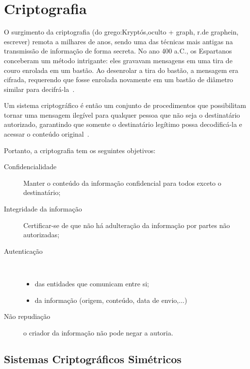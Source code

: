 

\chapter{Criptografia}

O surgimento da criptografia (do grego:Kryptós,oculto + graph, r.de graphein, escrever) remota a milhares de anos, sendo uma das técnicas mais antigas na transmissão de informação de forma secreta. No ano 400 a.C., os Espartanos conceberam um método intrigante: eles gravavam mensagens em uma tira de couro enrolada em um bastão. Ao desenrolar a tira do bastão, a mensagem era cifrada, requerendo que fosse enrolada novamente em um bastão de diâmetro similar para decifrá-la~\cite{Quaresma2009a}.

Um sistema criptográfico é então um conjunto de procedimentos que possibilitam tornar uma mensagem ilegível para qualquer pessoa que não seja o destinatário autorizado, garantindo que somente o destinatário legítimo possa decodificá-la e acessar o conteúdo original~\cite{Quaresma2009a}.

Portanto, a criptografia tem os seguintes objetivos:
\begin{description}
    \item[Confidencialidade] Manter o conteúdo da informação confidencial para todos exceto o destinatário;
    \item[Integridade da informação] Certificar-se de que não há adulteração da informação por partes não autorizadas;
    \item[Autenticação] {\ }
    \begin{itemize}
        \item das entidades que comunicam entre si;
        \item da informação (origem, conteúdo, data de envio,$\dots$)
    \end{itemize}
    \item[Não repudiação] o criador da informação não pode negar a autoria.
\end{description}

\section{Sistemas Criptográficos Simétricos}
\label{sec:SistemasCriptograficosSimetricos}

